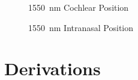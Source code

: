 \documentclass[journal,twoside,web]{ieeecolor}
\begin{document}
\begin{figure}[htb!]
    \caption{\label{fig:1550-Cochlear} 1550~nm Cochlear Position}
\end{figure}

\begin{figure}[htb!]
    \caption{\label{fig:1550-Intra} 1550~nm Intranasal Position}
\end{figure}
\section{Derivations}
\end{document}
